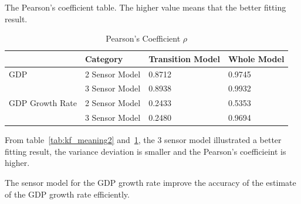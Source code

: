 \documentclass[11pt, a4paper]{article}
\begin{document}
The Pearson's coefficient table. The higher value means that the better fitting result.

\begin{table}[htbp] 
	\begin{center}
		\caption{Pearson's Coefficient $\rho$}
		\begin{tabular}{l|l|l|l}  \hline
			& Category & Transition Model & Whole Model \\ \hline
	
	GDP & 2 Sensor Model  & 0.8712   & 0.9745 \\
	    & 3 Sensor Model  & 0.8938  & 0.9932 \\ \hline
	    
	GDP Growth Rate & 2 Sensor Model & 0.2433  & 0.5353  \\
	 & 3 Sensor Model  & 0.2480  & 0.9694  \\ \hline 
	
	
		\end{tabular}
		
		\label{tab:kf_meaning3}
	\end{center}
\end{table}	

From table~\ref{tab:kf_meaning2} and~\ref{tab:kf_meaning3}, the 3 sensor model illustrated a better fitting result, the variance deviation is smaller and the Pearson's coefficieint is higher.

The sensor model for the GDP growth rate improve the accuracy of the estimate of the GDP growth rate efficiently. 


  
 





\end{document}
